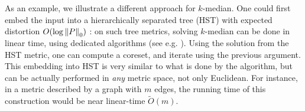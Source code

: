 As an example, we illustrate a different approach for $k$-median. One could first embed the input into a hierarchically separated tree (HST) with expected distortion $O(\log \left\| P \right\|_0)$ \cite{FakcharoenpholRT03}: on such tree metrics, solving $k$-median can be done in linear time, using dedicated algorithms (see e.g. \cite{Cohen-AddadLNSS21}). Using the solution from the HST metric, one can compute a coreset, and iterate using the previous argument.
This embedding into HST is very similar to what is done by the \fkmeans algorithm, but can be actually performed in \emph{any} metric space, not only Euclidean. 
For instance, in a metric described by a graph with $m$ edges, the running time of this construction would be near linear-time $\tilde O(m)$. %
